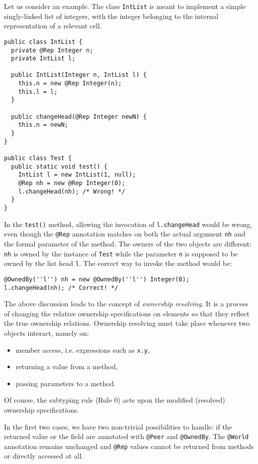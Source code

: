 \documentclass{pracamgr}
\theoremstyle{break}
\theoremstyle{break}
\theoremstyle{break}
\begin{document}
Let us consider an example. The class \texttt{IntList} is meant to
implement a simple singly-linked list of integers, with the integer
belonging to the internal representation of a relevant cell. 
\begin{lstlisting}
public class IntList {
  private @Rep Integer n;
  private IntList l;

  public IntList(Integer n, IntList l) {
    this.n = new @Rep Integer(n);
    this.l = l;
  }

  public changeHead(@Rep Integer newN) {
    this.n = newN;
  }
}

public class Test {
  public static void test() {
    IntList l = new IntList(1, null);
    @Rep nh = new @Rep Integer(0);
    l.changeHead(nh); /* Wrong! */
  }
}
\end{lstlisting}
In the \texttt{test()} method, allowing the invocation of
\texttt{l.changeHead} would be wrong, even though the \texttt{@Rep}
annotation matches on both the actual argument \texttt{nh} and the
formal parameter of the method. The owners of the two objects are
different: \texttt{nh} is owned by the instance of \texttt{Test} while
the parameter \texttt{n} is supposed to be owned by the list head
\texttt{l}. The correct way to invoke the method would be:
\begin{lstlisting}
@OwnedBy(''l'') nh = new @OwnedBy(''l'') Integer(0);
l.changeHead(nh); /* Correct! */
\end{lstlisting}

The above discussion leads to the concept of \emph{ownership
  resolving}. It is a process of changing the relative ownership
specifications on elements so that they reflect the true ownership
relations. Ownership resolving must take place whenever two objects
interact, namely on:
\begin{itemize}
\item member access, i.e. expressions such as \texttt{x.y},
\item returning a value from a method, 
\item passing parameters to a method. 
\end{itemize}
Of course, the subtyping rule (Rule 0) acts upon the modified
(resolved) ownership specifications.

In the first two cases, we have two non-trivial possibilities to
handle: if the returned value or the field are annotated with
\texttt{@Peer} and \texttt{@OwnedBy}. The \texttt{@World} annotation
remains unchanged and \texttt{@Rep} values cannot be returned from
methods or directly accessed at all.
\end{document}
